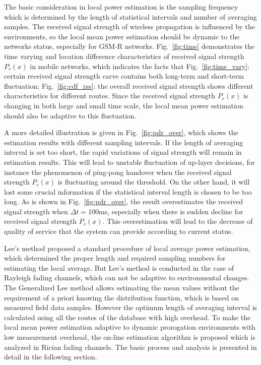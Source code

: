 The basic consideration in local power estimation is the sampling frequency which is determined by the length of statistical intervals and number of averaging samples. The received signal strength of wireless propagation is influenced by the environments, so the local mean power estimation should be dynamic to the networks status, especially for GSM-R networks. Fig.~\ref{fig:time} demonstrates the time varying and location difference characteristics of received signal strength $P_r(x)$ in mobile networks, which indicates the facts that Fig.~\ref{fig:time_vary}: certain received signal strength carve contains both long-term and short-term fluctuation; Fig.~\ref{fig:cdf_rss}: the overall received signal strength shows different characteristics for different routes. Since the received signal strength $P_r(x)$ is changing in both large and small time scale, the local mean power estimation should also be adaptive to this fluctuation.

A more detailed illustration is given in Fig.~\ref{fig:pdr_over}, which shows the estimation results with different sampling intervals. If the length of averaging interval is set too short, the rapid variations of signal strength will remain in estimation results. This will lead to unstable fluctuation of up-layer decisions, for instance the phenomenon of ping-pong handover when the received signal strength $P_r(x)$ is fluctuating around the threshold. On the other hand, it will lost some crucial information if the statistical interval length is chosen to be too long. As is shown in Fig.~\ref{fig:pdr_over}, the result overestimates the received signal strength when $\Delta t=100$ms, especially when there is sudden decline for received signal strength $P_r(x)$. This overestimation will lead to the decrease of quality of service that the system can provide according to current status.

Lee's method proposed a standard procedure of local average power estimation, which determined the proper length and required sampling numbers for estimating the local average. But Lee's method is conducted in the case of Rayleigh fading channels, which can not be adaptive to environmental changes. The Generalized Lee method allows estimating the mean values without the requirement of a priori knowing the distribution function, which is based on measured field data samples. However the optimum length of averaging interval is calculated using all the routes of the database with high overhead. To make the local mean power estimation adaptive to dynamic prorogation environments with low measurement overhead, the on-line estimation algorithm is proposed which is analyzed in Rician fading channels. The basic process and analysis is presented in detail in the following section.

